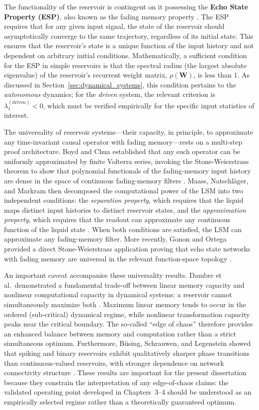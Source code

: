 The functionality of the reservoir is contingent on it possessing the \textbf{Echo State Property (ESP)}, also known as the fading memory property \cite{jaeger2001echo}. The ESP requires that for any given input signal, the state of the reservoir should asymptotically converge to the same trajectory, regardless of its initial state. This ensures that the reservoir's state is a unique function of the input history and not dependent on arbitrary initial conditions. Mathematically, a sufficient condition for the ESP in simple reservoirs is that the spectral radius (the largest absolute eigenvalue) of the reservoir's recurrent weight matrix, $\rho(\mathbf{W})$, is less than 1. As discussed in Section~\ref{sec:dynamical_systems}, this condition pertains to the \emph{autonomous} dynamics; for the \emph{driven} system, the relevant criterion is $\lambda_1^{(\text{driven})} < 0$, which must be verified empirically for the specific input statistics of interest.

The universality of reservoir systems---their capacity, in principle, to approximate any time-invariant causal operator with fading memory---rests on a multi-step proof architecture. Boyd and Chua established that any such operator can be uniformly approximated by finite Volterra series, invoking the Stone-Weierstrass theorem to show that polynomial functionals of the fading-memory input history are dense in the space of continuous fading-memory filters \cite{boyd_chua_1985}. Maass, Natschl\"{a}ger, and Markram then decomposed the computational power of the LSM into two independent conditions: the \emph{separation property}, which requires that the liquid maps distinct input histories to distinct reservoir states, and the \emph{approximation property}, which requires that the readout can approximate any continuous function of the liquid state \cite{Maass2002RealTime}. When both conditions are satisfied, the LSM can approximate any fading-memory filter. More recently, Gonon and Ortega provided a direct Stone-Weierstrass application proving that echo state networks with fading memory are universal in the relevant function-space topology \cite{gonon_ortega_2020}.

An important caveat accompanies these universality results. Dambre et al.\ demonstrated a fundamental trade-off between linear memory capacity and nonlinear computational capacity in dynamical systems: a reservoir cannot simultaneously maximize both \cite{dambre_2012}. Maximum linear memory tends to occur in the ordered (sub-critical) dynamical regime, while nonlinear transformation capacity peaks near the critical boundary. The so-called ``edge of chaos'' therefore provides an enhanced balance between memory and computation rather than a strict simultaneous optimum. Furthermore, B\"{u}sing, Schrauwen, and Legenstein showed that spiking and binary reservoirs exhibit qualitatively sharper phase transitions than continuous-valued reservoirs, with stronger dependence on network connectivity structure \cite{busing_2010}. These results are important for the present dissertation because they constrain the interpretation of any edge-of-chaos claims: the validated operating point developed in Chapters~3--4 should be understood as an empirically selected regime rather than a theoretically guaranteed optimum.

